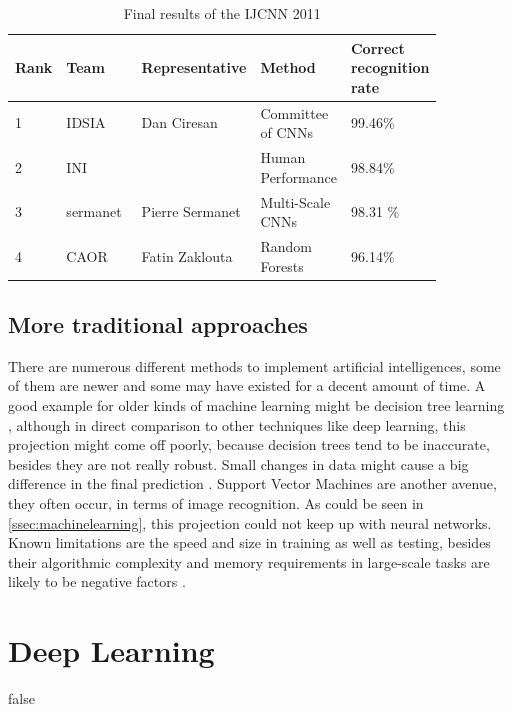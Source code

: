 \begin{table}[h]
	\begin{tabular}{||p{0.05\linewidth} | p{0.2\linewidth}|p{0.2\linewidth}|p{0.2\linewidth}|p{0.2\linewidth}||}
		\hline
		Rank  &	Team & Representative &	Method &	Correct recognition rate\\
		\hline
		\hline
		1 & IDSIA & Dan Ciresan & Committee of CNNs &	99.46\% \\
		\hline
		2 &	INI & & Human Performance & 98.84\% \\
		\hline
		3 & sermanet & Pierre Sermanet & Multi-Scale CNNs & 98.31 \% \\
		\hline
		4 & CAOR & Fatin Zaklouta & Random Forests &	96.14\% \\
		\hline
		
	\end{tabular}
	\caption{Final results of the IJCNN 2011}
	\label{table:icjnn2011}
	
\end{table}

\subsection{More traditional approaches}
There are numerous different methods to implement artificial intelligences, some of them are newer and some may have existed for a decent amount of time. 
A good example for older kinds of machine learning might be decision tree learning \cite{decision}, although in direct comparison to other techniques like deep learning, this projection might come off poorly, because decision trees tend to be inaccurate, besides they are not really robust. Small changes in data might cause a big difference in the final prediction \cite{decisionbook}. \newline
Support Vector Machines are another avenue, they often occur, in terms of image recognition. As could be seen in \ref{ssec:machinelearning}, this projection could not keep up with neural networks. Known limitations are the speed and size in training as well as testing, besides their algorithmic complexity and memory requirements in large-scale tasks are likely to be negative factors \cite{burges}. 


\section{Deep Learning}\label{ssec:koreancnn}


\if false

